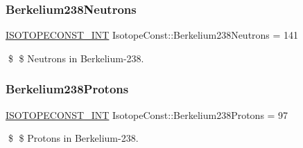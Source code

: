 \subsubsection{\texorpdfstring{Berkelium238\+Neutrons}{Berkelium238Neutrons}}
{\footnotesize\ttfamily \mbox{\hyperlink{group___isotope_const-_macros_ga5f18360b3e99483a35c32d789e62621c}{I\+S\+O\+T\+O\+P\+E\+C\+O\+N\+S\+T\+\_\+\+I\+NT}} Isotope\+Const\+::\+Berkelium238\+Neutrons = 141}

\$ \$ Neutrons in Berkelium-\/238. \mbox{\label{group___isotope_const-_berkelium-_bk238_ga74f53a4442ee857e8477efc0119db055}} 
\subsubsection{\texorpdfstring{Berkelium238\+Protons}{Berkelium238Protons}}
{\footnotesize\ttfamily \mbox{\hyperlink{group___isotope_const-_macros_ga5f18360b3e99483a35c32d789e62621c}{I\+S\+O\+T\+O\+P\+E\+C\+O\+N\+S\+T\+\_\+\+I\+NT}} Isotope\+Const\+::\+Berkelium238\+Protons = 97}

\$ \$ Protons in Berkelium-\/238. 